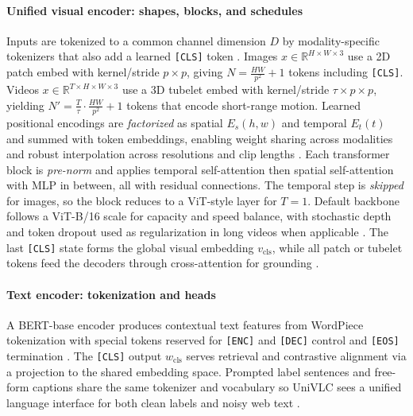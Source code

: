 \begin{enrichment}
\begin{enrichment}
        \paragraph{Unified visual encoder: shapes, blocks, and schedules}
        Inputs are tokenized to a common channel dimension \(D\) by modality-specific tokenizers that also add a learned \texttt{[CLS]} token \cite{wang2022_omnivl}. Images \(x\!\in\!\mathbb{R}^{H\times W\times 3}\) use a 2D patch embed with kernel/stride \(p\times p\), giving \(N=\tfrac{HW}{p^2}\!+\!1\) tokens including \texttt{[CLS]}. Videos \(x\!\in\!\mathbb{R}^{T\times H\times W\times 3}\) use a 3D tubelet embed with kernel/stride \(\tau\times p\times p\), yielding \(N'=\tfrac{T}{\tau}\cdot\tfrac{HW}{p^2}\!+\!1\) tokens that encode short-range motion. Learned positional encodings are \emph{factorized} as spatial \(E_s(h,w)\) and temporal \(E_t(t)\) and summed with token embeddings, enabling weight sharing across modalities and robust interpolation across resolutions and clip lengths \cite{wang2022_omnivl}. Each transformer block is \emph{pre-norm} and applies temporal self-attention then spatial self-attention with MLP in between, all with residual connections. The temporal step is \emph{skipped} for images, so the block reduces to a ViT-style layer for \(T{=}1\). Default backbone follows a ViT-B/16 scale for capacity and speed balance, with stochastic depth and token dropout used as regularization in long videos when applicable \cite{bertasius2021_timesformer,wang2022_omnivl}. The last \texttt{[CLS]} state forms the global visual embedding \(v_{\mathrm{cls}}\), while all patch or tubelet tokens feed the decoders through cross-attention for grounding \cite{wang2022_omnivl}.
        
        \paragraph{Text encoder: tokenization and heads}
        A BERT-base encoder produces contextual text features from WordPiece tokenization with special tokens reserved for \texttt{[ENC]} and \texttt{[DEC]} control and \texttt{[EOS]} termination \cite{devlin2019_bert,wang2022_omnivl}. The \texttt{[CLS]} output \(w_{\mathrm{cls}}\) serves retrieval and contrastive alignment via a projection to the shared embedding space. Prompted label sentences and free-form captions share the same tokenizer and vocabulary so UniVLC sees a unified language interface for both clean labels and noisy web text \cite{wang2022_omnivl}.
        

\end{enrichment}
\end{enrichment}

